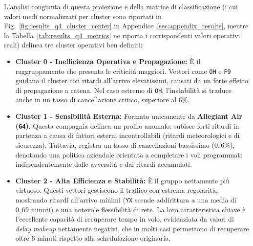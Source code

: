 \documentclass[conference]{IEEEtran}
\begin{document}
L'analisi congiunta di questa proiezione e della matrice di classificazione (i cui valori medi normalizzati per cluster sono riportati in Fig.~\ref{fig:results_q4_cluster_center} in Appendice~\ref{sec:appendix_results}, mentre la Tabella~\ref{tab:results_q4_metrics} ne riporta i corrispondenti valori operativi reali) delinea tre cluster operativi ben definiti:

\begin{itemize}
    \item \textbf{Cluster 0 - Inefficienza Operativa e Propagazione:} È il raggruppamento che presenta le criticità maggiori.
    Vettori come \texttt{OH} e \texttt{F9} guidano il cluster con ritardi all'arrivo elevatissimi, causati da un forte effetto di propagazione a catena.
    Nel caso estremo di \texttt{OH}, l'instabilità si traduce anche in un tasso di cancellazione critico, superiore al $6\%$.
    \item \textbf{Cluster 1 - Sensibilità Esterna:} Formato unicamente da \textbf{Allegiant Air (\texttt{G4})}.
    Questa compagnia delinea un profilo anomalo: subisce forti ritardi in partenza a causa di fattori esterni incontrollabili (ritardi meteorologici e di sicurezza).
    Tuttavia, registra un tasso di cancellazioni bassissimo ($0,6\%$), denotando una politica aziendale orientata a completare i voli programmati indipendentemente dalle avversità e dai ritardi accumulati.
    \item \textbf{Cluster 2 - Alta Efficienza e Stabilità:} È il gruppo nettamente più virtuoso.
    Questi vettori gestiscono il traffico con estrema regolarità, mostrando ritardi all'arrivo minimi (\texttt{YX} scende addirittura a una media di $0,69$ minuti) e una notevole flessibilità di rete.
    La loro caratteristica chiave è l'eccellente capacità di recuperare tempo in volo, evidenziata da valori di \textit{delay makeup} nettamente negativi, che in molti casi permettono di recuperare oltre $6$ minuti rispetto alla schedulazione originaria.
\end{itemize}

\end{document}
